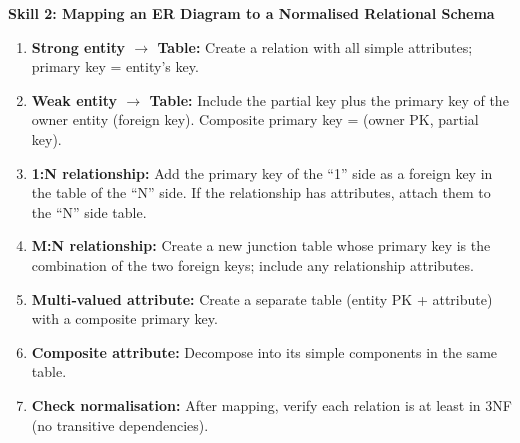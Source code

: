 \documentclass[11pt]{article}
\begin{document}
\textbf{Skill 2: Mapping an ER Diagram to a Normalised Relational Schema}\par
\begin{methode}
\begin{enumerate}
\item \textbf{Strong entity $\rightarrow$ Table:} Create a relation with all simple attributes; primary key = entity’s key.
\item \textbf{Weak entity $\rightarrow$ Table:} Include the partial key plus the primary key of the owner entity (foreign key). Composite primary key = (owner PK, partial key).
\item \textbf{1:N relationship:} Add the primary key of the “1” side as a foreign key in the table of the “N” side. If the relationship has attributes, attach them to the “N” side table.
\item \textbf{M:N relationship:} Create a new junction table whose primary key is the combination of the two foreign keys; include any relationship attributes.
\item \textbf{Multi‑valued attribute:} Create a separate table (entity PK + attribute) with a composite primary key.
\item \textbf{Composite attribute:} Decompose into its simple components in the same table.
\item \textbf{Check normalisation:} After mapping, verify each relation is at least in 3NF (no transitive dependencies).
\end{enumerate}
\end{methode}
\end{document}
